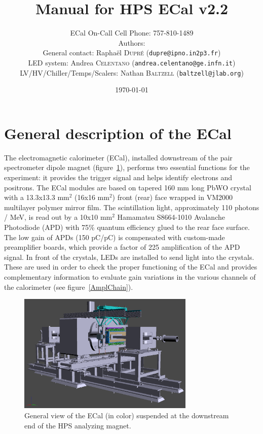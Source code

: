 \documentclass[12pt]{article}
\title{Manual for HPS ECal v2.2}
\author{ECal On-Call Cell Phone: 757-810-1489 \\ 
Authors: \\
General contact: Rapha\"el \textsc{Dupr\'e} (\texttt{dupre@ipno.in2p3.fr})\\ 
LED system: Andrea \textsc{Celentano} (\texttt{andrea.celentano@ge.infn.it})\\
LV/HV/Chiller/Temps/Scalers: Nathan \textsc{Baltzell} (\texttt{baltzell@jlab.org})\\
}
\date{\today} %
\begin{document}
\maketitle{}

\tableofcontents

\newpage
   \section{General description of the ECal}


The electromagnetic calorimeter (ECal), installed downstream of the pair spectrometer dipole magnet (figure~\ref{GView}), performs two essential functions for the experiment: it provides the trigger signal and helps identify electrons and positrons. The ECal modules are based on tapered 160 mm long PbWO crystal with a 13.3x13.3 mm$^2$ (16x16 mm$^2$) front (rear) face wrapped in VM2000 multilayer polymer mirror film. The scintillation light, approximately 110 photons / MeV, is read out by a 10x10 mm$^2$ Hamamatsu S8664-1010 Avalanche Photodiode (APD) with 75\% quantum efficiency glued to the rear face surface. The low gain of APDs (150 pC/pC) is compensated with custom-made preamplifier boards, which provide a factor of 225 amplification of the APD signal. In front of the crystals, LEDs are installed to send light into the crystals. These are used in order to check the proper functioning of the ECal and provides complementary information to evaluate gain variations in the various channels of the calorimeter (see figure~\ref{AmplChain}).

\begin{figure}[htpb]\center
\includegraphics[width=0.75\textwidth]{pics/GView.png}
\caption{\label{GView} General view of the ECal (in color) suspended at the downstream end of the HPS analyzing magnet.}
\end{figure}
      
\end{document}
